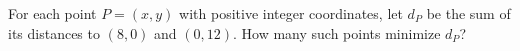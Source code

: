 For each point $P=(x,y)$ with positive integer coordinates, let $d_P$ be the sum of its distances to $(8,0)$ and $(0,12)$. How many such points minimize $d_P$?
